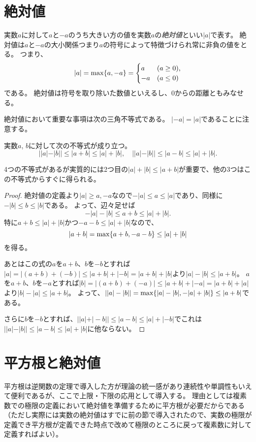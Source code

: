 \section{絶対値}

実数$a$に対して$a$と$-a$のうち大きい方の値を実数$a$の\emph{絶対値}といい$|a|$で表す。
絶対値は$a$と$-a$の大小関係つまり$a$の符号によって特徴づけられ常に非負の値をとる。
つまり、
$$
|a| = \max\{ a, -a \} =
\begin{cases}
a & \text{($a \ge 0$),} \\
-a & \text{($a \le 0$)}
\end{cases}
$$
である。
絶対値は符号を取り除いた数値といえるし、$0$からの距離ともみなせる。

絶対値において重要な事項は次の三角不等式である。
$|-a| = |a|$であることに注意する。

\begin{proposition}[実数の絶対値の三角不等式]
実数$a$, $b$に対して次の不等式が成り立つ。
$$
||a|-|b|| \le |a+b| \le |a|+|b|,
\quad ||a|-|b|| \le |a-b| \le |a|+|b|.
$$
\end{proposition}

4つの不等式があるが実質的には2つ目の$|a|+|b| \le |a+b|$が重要で、他の3つはこの不等式からすぐに得られる。

\begin{proof}
絶対値の定義より$|a| \ge a, -a$なので$-|a| \le a \le |a|$であり、同様に$-|b| \le b \le |b|$である。
よって、辺々足せば
$$
-|a|-|b| \le a+b \le |a|+|b|.
$$
特に$a+b \le |a|+|b|$かつ$-a-b \le |a|+|b|$なので、
$$
|a+b| = \max\{ a+b, -a-b \} \le |a|+|b|
$$
を得る。

あとはこの式の$a$を$a+b$、$b$を$-b$とすれば$|a| = |(a+b)+(-b)| \le |a+b|+|-b| = |a+b|+|b|$より$|a|-|b| \le |a+b|$。
$a$を$a+b$、$b$を$-a$とすれば$|b| = |(a+b)+(-a)| \le |a+b|+|-a| = |a+b|+|a|$より$|b|-|a| \le |a+b|$。
よって、$||a|-|b|| = \max\{ |a|-|b|, -|a|+|b| \} \le |a+b|$である。

さらに$b$を$-b$とすれば、$||a|+|-b|| \le |a-b| \le |a|+|-b|$でこれは$||a|-|b|| \le |a-b| \le |a|+|b|$に他ならない。
\end{proof}

\section{平方根と絶対値}

平方根は逆関数の定理で導入した方が理論の統一感があり連続性や単調性もいえて便利であるが、ここで上限・下限の応用として導入する。
理由としては複素数での極限の定義において絶対値を準備するために平方根が必要だからである（ただし実際には実数の絶対値はすでに前の節で導入されたので、実数の極限が定義でき平方根が定義できた時点で改めて極限のところに戻って複素数に対して定義すればよい）。

